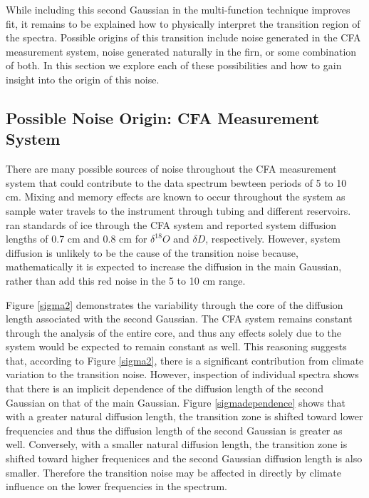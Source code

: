 \documentclass[draft, jgrga]{AGUTeX}
\begin{document}
\begin{article}
While including this second Gaussian in the multi-function technique improves fit, it remains to be explained how to physically interpret the transition region of the spectra. Possible origins of this transition include noise generated in the CFA measurement system, noise generated naturally in the firn, or some combination of both. In this section we explore each of these possibilities and how to gain insight into the origin of this noise.

\subsection{Possible Noise Origin: CFA Measurement System}

There are many possible sources of noise throughout the CFA measurement system that could contribute to the data spectrum bewteen periods of 5 to 10 cm. Mixing and memory effects are known to occur throughout the system as sample water travels to the instrument through tubing and different reservoirs. \citet{JonesCFA2016} ran standards of ice through the CFA system and reported system diffusion lengths of 0.7 cm and 0.8 cm for $\delta ^{18}O$ and $\delta D$, respectively. However, system diffusion is unlikely to be the cause of the transition noise because, mathematically it is expected to increase the diffusion in the main Gaussian, rather than add this red noise in the 5 to 10 cm range.

Figure \ref{sigma2} demonstrates the variability through the core of the diffusion length associated with the second Gaussian. The CFA system remains constant through the analysis of the entire core, and thus any effects solely due to the system would be expected to remain constant as well. This reasoning suggests that, according to Figure \ref{sigma2}, there is a significant contribution from climate variation to the transition noise. However, inspection of individual spectra shows that there is an implicit dependence of the diffusion length of the second Gaussian on that of the main Gaussian. Figure \ref{sigmadependence} shows that with a greater natural diffusion length, the transition zone is shifted toward lower frequencies and thus the diffusion length of the second Gaussian is greater as well. Conversely, with a smaller natural diffusion length, the transition zone is shifted toward higher frequenices and the second Gaussian diffusion length is also smaller. Therefore the transition noise may be affected in directly by climate influence on the lower frequencies in the spectrum.




\end{article}
\end{document}
